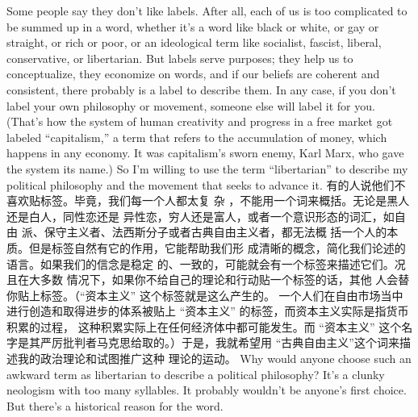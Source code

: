 \begin{paracol}{2}
Some people say they don't like labels. After all, each of us is too
complicated to be summed up in a word, whether it's a word
like black or white, or gay or straight, or rich or poor, or an ideological term like socialist, fascist, liberal, conservative, or libertarian. But labels serve purposes; they help us to conceptualize,
they economize on words, and if our beliefs are coherent and
consistent, there probably is a label to describe them. In any
case, if you don't label your own philosophy or movement,
someone else will label it for you. (That's how the system of
human creativity and progress in a free market got labeled
``capitalism,'' a term that refers to the accumulation of money,
which happens in any economy. It was capitalism's sworn
enemy, Karl Marx, who gave the system its name.) So I'm willing to use the term ``libertarian'' to describe my political philosophy and the movement that seeks to advance it.
\switchcolumn
有的人说他们不喜欢贴标签。毕竟，我们每一个人都太复
杂 ，不能用一个词来概括。无论是黑人还是白人，同性恋还是
异性恋，穷人还是富人，或者一个意识形态的词汇，如自由
派、保守主义者、法西斯分子或者古典自由主义者，都无法概
括一个人的本质。但是标签自然有它的作用，它能帮助我们形
成清晰的概念，简化我们论述的语言。如果我们的信念是稳定
的、一致的，可能就会有一个标签来描述它们。况且在大多数
情况下，如果你不给自己的理论和行动贴一个标签的话，其他
人会替你贴上标签。（“资本主义” 这个标签就是这么产生的。
一个人们在自由市场当中进行创造和取得进步的体系被贴上
“资本主义” 的标签，而资本主义实际是指货币积累的过程，
这种积累实际上在任何经济体中都可能发生。而 “资本主义”
这个名字是其严厉批判者马克思给取的。）于是，我就希望用
“古典自由主义”这个词来描述我的政治理论和试图推广这种
理论的运动。
\switchcolumn*
Why would anyone choose such an awkward term as libertarian to describe a political philosophy? It's a clunky neologism with too many syllables. It probably wouldn't be anyone's
first choice. But there's a historical reason for the word.


\end{paracol}
